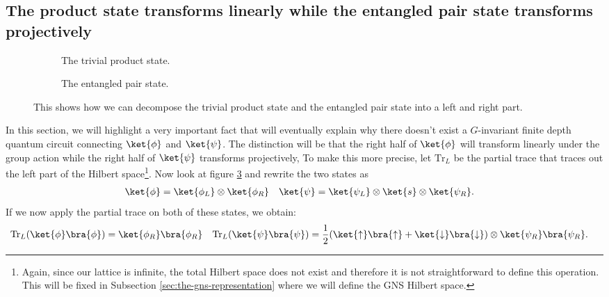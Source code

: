 \subsection{The product state transforms linearly while the entangled pair state transforms projectively}\label{sec:the-product-state-transforms-linearly-while-the-entangled-pair-state-transforms-projectively}
\begin{figure}
	\centering
	\begin{subfigure}{\textwidth}
		\centering
		
		\caption{The trivial product state.}
		\label{fig:TrivialProductStateTwoParts}
	\end{subfigure}
	\begin{subfigure}{\textwidth}
		\centering
		
		\caption{The entangled pair state.}
		\label{fig:FakeAKLT_State_TwoParts}
	\end{subfigure}
	\caption{This shows how we can decompose the trivial product state and the entangled pair state into a left and right part.}
	\label{fig:TheTwoHaldanePhasesTwoParts}
\end{figure}
In this section, we will highlight a very important fact that will eventually explain why there doesn't exist a $G$-invariant finite depth quantum circuit connecting $\ket{\phi}$ and $\ket{\psi}$. The distinction will be that the right half of $\ket{\phi}$ will transform linearly under the group action while the right half of $\ket{\psi}$ transforms projectively, To make this more precise, let $\textrm{Tr}_L$ be the partial trace that traces out the left part of the Hilbert space\footnote{Again, since our lattice is infinite, the total Hilbert space does not exist and therefore it is not straightforward to define this operation. This will be fixed in Subsection \ref{sec:the-gns-representation} where we will define the GNS Hilbert space.}. Now look at figure \ref{fig:TheTwoHaldanePhasesTwoParts} and rewrite the two states as
\begin{align}
\ket{\phi}&=\ket{\phi_L}\otimes\ket{\phi_R}&\ket{\psi}&=\ket{\psi_L}\otimes\ket{s}\otimes\ket{\psi_R}.
\end{align}
If we now apply the partial trace on both of these states, we obtain:
\begin{align}
\textrm{Tr}_L(\ket{\phi}\bra{\phi})&=\ket{\phi_R}\bra{\phi_R}&\textrm{Tr}_L(\ket{\psi}\bra{\psi})&=\frac{1}{2}(\ket{\uparrow}\bra{\uparrow}+\ket{\downarrow}\bra{\downarrow})\otimes \ket{\psi_R}\bra{\psi_R}.
\end{align}
